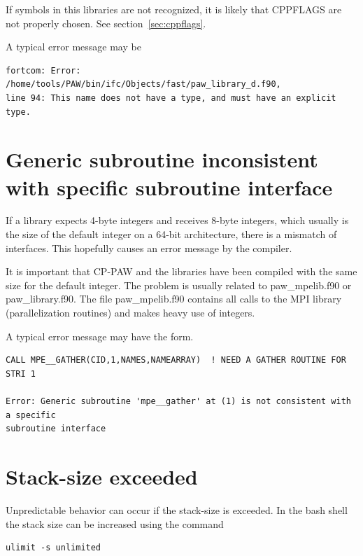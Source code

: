 \documentclass[a4paper,10pt]{report}
\begin{document}
If symbols in this libraries are not recognized, it is likely that
CPPFLAGS are not properly chosen. See section~\ref{sec:cppflags}.

A typical error message may be
\begin{verbatim}
fortcom: Error: /home/tools/PAW/bin/ifc/Objects/fast/paw_library_d.f90, 
line 94: This name does not have a type, and must have an explicit type.
\end{verbatim}

\section{Generic subroutine inconsistent with specific subroutine interface}

If a library expects 4-byte integers and receives 8-byte integers,
which usually is the size of the default integer on a 64-bit
architecture, there is a mismatch of interfaces. This hopefully causes
an error message by the compiler.

It is important that CP-PAW and the libraries have been compiled with
the same size for the default integer. The problem is usually related
to paw\_mpelib.f90 or paw\_library.f90. The file paw\_mpelib.f90
contains all calls to the MPI library (parallelization routines) and
makes heavy use of integers.

A typical error message may have the form.
\begin{verbatim}
CALL MPE__GATHER(CID,1,NAMES,NAMEARRAY)  ! NEED A GATHER ROUTINE FOR STRI 1

Error: Generic subroutine 'mpe__gather' at (1) is not consistent with a specific 
subroutine interface
\end{verbatim}

\section{Stack-size exceeded}
Unpredictable behavior can occur if the stack-size is exceeded. In the
bash shell the stack size can be increased using the command
\begin{verbatim}
ulimit -s unlimited
\end{verbatim}
\end{document}
